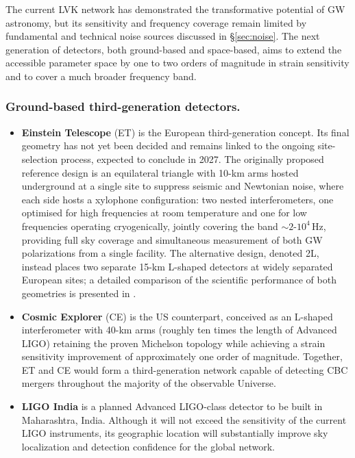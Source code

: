 The current LVK network has demonstrated the transformative potential of GW astronomy, but its sensitivity and frequency coverage remain limited by fundamental and technical noise sources discussed in \S\ref{sec:noise}. The next generation of detectors, both ground-based and space-based, aims to extend the accessible parameter space by one to two orders of magnitude in strain sensitivity and to cover a much broader frequency band.

\subsubsection{Ground-based third-generation detectors.}


\begin{itemize}
    \item \textbf{Einstein Telescope} (ET) \cite{Einsteintelescope} is the European third-generation concept. Its final geometry has not yet been decided and remains linked to the ongoing site-selection process, expected to conclude in 2027. The originally proposed reference design is an equilateral triangle with 10-km arms hosted underground at a single site to suppress seismic and Newtonian noise, where each side hosts a xylophone configuration: two nested interferometers, one optimised for high frequencies at room temperature and one for low frequencies operating cryogenically, jointly covering the band $\sim\!2$-$10^4$\,Hz, providing full sky coverage and simultaneous measurement of both GW polarizations from a single facility. The alternative design, denoted 2L, instead places two separate 15-km L-shaped detectors at widely separated European sites; a detailed comparison of the scientific performance of both geometries is presented in \cite{einstein_telescope_designs}.
    \item \textbf{Cosmic Explorer} (CE) \cite{evans2021horizonstudycosmicexplorer} is the US counterpart, conceived as an L-shaped interferometer with 40-km arms (roughly ten times the length of Advanced LIGO) retaining the proven Michelson topology while achieving a strain sensitivity improvement of approximately one order of magnitude. Together, ET and CE would form a third-generation network capable of detecting CBC mergers throughout the majority of the observable Universe.
    \item \textbf{LIGO India} \cite{LIGO_INDIA} is a planned Advanced LIGO-class detector to be built in Maharashtra, India. Although it will not exceed the sensitivity of the current LIGO instruments, its geographic location will substantially improve sky localization and detection confidence for the global network.
\end{itemize}


